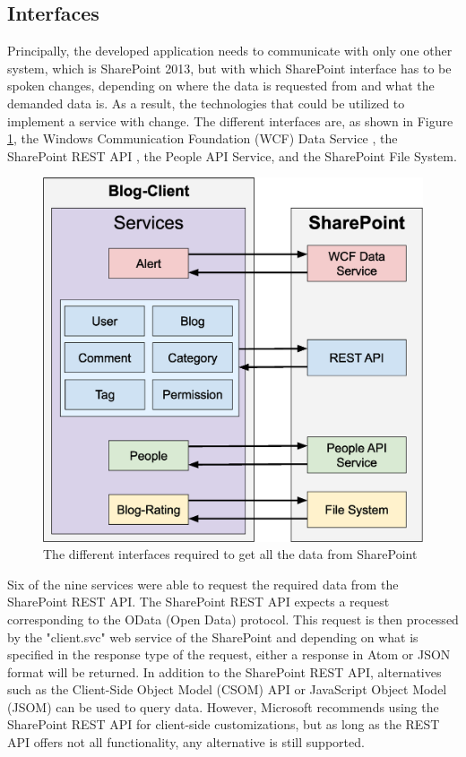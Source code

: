 \documentclass[Bachelor,BIF,english]{twbook}
\begin{document}
\subsection{Interfaces}
Principally, the developed application needs to communicate with only one other system, which is SharePoint 2013, but with which SharePoint interface has to be spoken changes, depending on where the data is requested from and what the demanded data is. As a result, the technologies that could be utilized to implement a service with change. The different interfaces are, as shown in Figure \ref{Fig7}, the Windows Communication Foundation (WCF) Data Service \cite{SPWcf}, the SharePoint REST API \cite{SPRest}, the People API Service, and the SharePoint File System.
\\[\baselineskip]
\begin{figure}[!htbp]
\centering
\includegraphics[width=0.625\linewidth]{PICs/communication_sharepoint_services.eps}
\caption{The different interfaces required to get all the data from SharePoint}\label{Fig7}
\end{figure}
Six of the nine services were able to request the required data from the SharePoint REST API. The SharePoint REST API expects a request corresponding to the OData (Open Data) protocol. This request is then processed by the "client.svc" web service of the SharePoint and depending on what is specified in the response type of the request, either a response in Atom or JSON format will be returned. In addition to the SharePoint REST API, alternatives such as the Client-Side Object Model (CSOM) API \cite{CSOM} or JavaScript Object Model (JSOM) \cite{JSOM} can be used to query data. However, Microsoft recommends using the SharePoint REST API for client-side customizations, but as long as the REST API offers not all functionality, any alternative is still supported.
\end{document}
